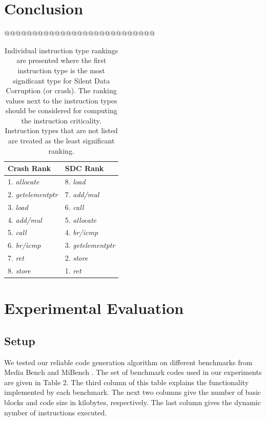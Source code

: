 \section{Conclusion}\label{sec:conclusion}
@@@@@@@@@@@@@@@@@@@@@@@@@@@






\begin{table}
\begin{center}
\caption
{
Individual instruction type rankings are presented where the first instruction type is the most significant type for Silent Data Corruption (or crash). The ranking values next to the instruction types should be considered for computing the instruction criticality. Instruction types that are not listed are treated as the least significant ranking. 
} 
\begin{tabular}{ p{2.5cm} p{2.5cm}}
 \textbf{Crash Rank}& \textbf{SDC Rank} \\
 \hline
 1. \emph{allocate} & 8. \emph{load} \\
 2. \emph{getelementptr} & 7. \emph{add/mul}  \\
 3. \emph{load} & 6. \emph{call}  \\
 4. \emph{add/mul} & 5. \emph{allocate}  \\
 5. \emph{call} & 4. \emph{br/icmp}  \\
 6. \emph{br/icmp} & 3. \emph{getelementptr}  \\
 7. \emph{ret} & 2. \emph{store} \\
 8. \emph{store} & 1. \emph{ret}  \\
\end{tabular}
\end{center}
\end{table}

\section{Experimental Evaluation}\label{sec:evaluation}

\subsection{Setup}
We tested our reliable code generation algorithm on different benchmarks from Media Bench \cite{MediaBench:1997} and MiBench \cite{MiBench:2001}. The set of benchmark codes used in our experiments are given in Table 2. The third column of this table explains the functionality implemented by each benchmark. The next two columns give the number of basic blocks and code size in kilobytes, respectively. The last column gives the dynamic nymber of instructions executed. 

